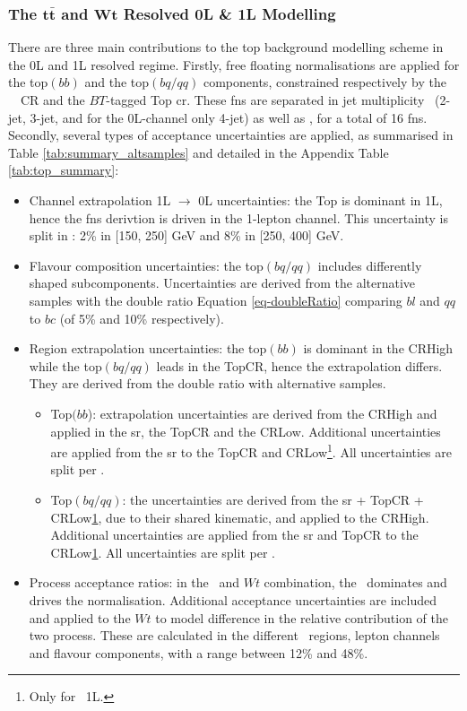 \subsubsection{The $\boldsymbol{t\bar{t}}$ and $\boldsymbol{Wt}$ Resolved 0L \& 1L Modelling}
There are three main contributions to the top background modelling scheme in the 0L and 1L resolved regime. Firstly, free floating normalisations are applied for the top$(bb)$ and the top$(bq/qq)$ components, constrained respectively by the \vhb\ \highdr\ CR and the $BT$-tagged Top \gls{cr}. These \gls{fn}s are separated in jet multiplicity \nj\ (2-jet, 3-jet, and for the 0L-channel only 4-jet) as well as \ptv, for a total of 16 \gls{fn}s. Secondly, several types of acceptance uncertainties are applied, as summarised in Table \ref{tab:summary_altsamples} and detailed in the Appendix Table \ref{tab:top_summary}:
\begin{itemize}[leftmargin=*]
    \item Channel extrapolation 1L $\rightarrow$ 0L uncertainties: the Top is dominant in 1L, hence the \gls{fn}s derivtion is driven in the 1-lepton channel. This uncertainty is split in \ptv: 2\% in [150, 250] GeV and 8\% in [250, 400] GeV.
    \item Flavour composition uncertainties: the top$(bq/qq)$ includes differently shaped subcomponents. Uncertainties are derived from the alternative samples with the double ratio Equation \ref{eq-doubleRatio} comparing $bl$ and $qq$ to $bc$ (of 5\% and 10\% respectively). 
    \item Region extrapolation uncertainties: the top$(bb)$ is dominant in the CRHigh while the top$(bq/qq)$ leads in the TopCR, hence the extrapolation differs. They are derived from the double ratio with alternative samples.
    \begin{itemize}
        \item Top$(bb$): extrapolation uncertainties are derived from the CRHigh and applied in the \gls{sr}, the TopCR and the CRLow. Additional uncertainties are applied from the \gls{sr} to the TopCR and CRLow\footnote{\label{footnote-crlow}Only for \vhb\ 1L.}. All uncertainties are split per \ptv.
        \item Top$(bq/qq)$: the uncertainties are derived from the \gls{sr} + TopCR + CRLow\cref{footnote-crlow}, due to their shared kinematic, and applied to the CRHigh. Additional uncertainties are applied from the \gls{sr} and TopCR to the CRLow\cref{footnote-crlow}. All uncertainties are split per \ptv.
    \end{itemize}
    \item Process acceptance ratios: in the \ttb\ and $Wt$ combination, the \ttb\ dominates and drives the normalisation. Additional acceptance uncertainties are included and applied to the $Wt$ to model difference in the relative contribution of the two process. These are calculated in the different \ptv\ regions, lepton channels and flavour components, with a range between 12\% and 48\%.
\end{itemize}
